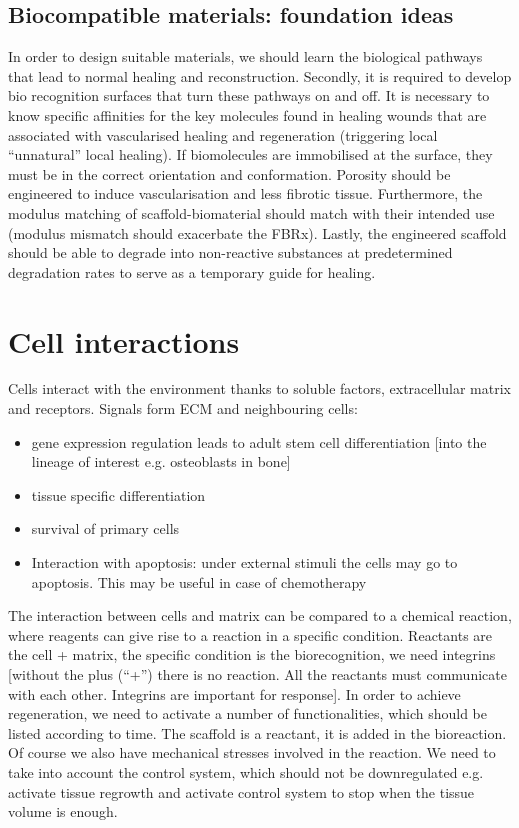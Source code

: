 \subsection{Biocompatible materials: foundation ideas}
In order to design suitable materials, we should learn the biological pathways that lead to normal healing and reconstruction. Secondly, it is required to develop bio recognition surfaces that turn these pathways on and off. It is necessary to know specific affinities for the key molecules found in healing wounds that are associated with vascularised healing and regeneration (triggering local “unnatural” local healing).
If biomolecules are immobilised at the surface, they must be in the correct orientation and conformation. Porosity should be engineered to induce vascularisation and less fibrotic tissue. Furthermore, the modulus matching of scaffold-biomaterial should match with their intended use (modulus mismatch should exacerbate the FBRx).
Lastly, the engineered scaffold should be able to degrade into non-reactive substances at predetermined degradation rates to serve as a temporary guide for healing.

\section{Cell interactions}
Cells interact with the environment thanks to soluble factors, extracellular matrix and receptors.
Signals form ECM and neighbouring cells:
\begin{itemize}
\item gene expression regulation leads to adult stem cell differentiation [into the lineage of interest e.g. osteoblasts in bone]
\item tissue specific differentiation
\item survival of primary cells
\item Interaction with apoptosis: under external stimuli the cells may go to apoptosis. This may be useful in case of chemotherapy
\end{itemize}
The interaction between cells and matrix can be compared to a chemical reaction, where reagents can give rise to a reaction in a specific condition. Reactants are the cell + matrix, the specific condition is the biorecognition, we need integrins [without the plus (“+”) there is no reaction. All the reactants must communicate with each other. Integrins are important for response]. 
In order to achieve regeneration, we need to activate a number of functionalities, which should be listed according to time. The scaffold is a reactant, it is added in the bioreaction. Of course we also have mechanical stresses involved in the reaction. We need to take into account the control system, which should not be downregulated e.g. activate tissue regrowth and activate control system to stop when the tissue volume is enough. 

